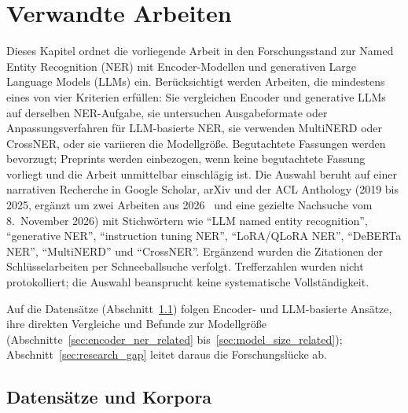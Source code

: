 %

\chapter{Verwandte Arbeiten}
\label{chap:verwandte_arbeiten}

Dieses Kapitel ordnet die vorliegende Arbeit in den Forschungsstand zur
Named Entity Recognition (NER) mit Encoder-Modellen und generativen Large
Language Models (LLMs) ein.
Berücksichtigt werden Arbeiten, die mindestens eines von vier Kriterien
erfüllen: Sie vergleichen Encoder und generative LLMs auf derselben
NER-Aufgabe, sie untersuchen Ausgabeformate oder Anpassungsverfahren für
LLM-basierte NER, sie verwenden MultiNERD oder CrossNER, oder sie
variieren die Modellgröße.
Begutachtete Fassungen werden bevorzugt; Preprints werden einbezogen,
wenn keine begutachtete Fassung vorliegt und die Arbeit unmittelbar
einschlägig ist.
Die Auswahl beruht auf einer narrativen Recherche in Google Scholar,
arXiv und der ACL Anthology (2019 bis 2025, ergänzt um zwei Arbeiten
aus 2026~\cite{zhan2026generativeNER,semin2026spanLabeling} und eine
gezielte Nachsuche vom 8.~November 2026) mit Stichwörtern wie
\enquote{LLM named entity recognition}, \enquote{generative NER},
\enquote{instruction tuning NER}, \enquote{LoRA/QLoRA NER},
\enquote{DeBERTa NER}, \enquote{MultiNERD} und \enquote{CrossNER}.
Ergänzend wurden die Zitationen der Schlüsselarbeiten per
Schneeballsuche verfolgt.
Trefferzahlen wurden nicht protokolliert; die Auswahl beansprucht keine
systematische Vollständigkeit.

Auf die Datensätze (Abschnitt~\ref{sec:datasets_corpora}) folgen Encoder- und
LLM-basierte Ansätze, ihre direkten Vergleiche und Befunde zur
Modellgröße (Abschnitte~\ref{sec:encoder_ner_related}
bis~\ref{sec:model_size_related}); Abschnitt~\ref{sec:research_gap}
leitet daraus die Forschungslücke ab.

\section{Datensätze und Korpora}
\label{sec:datasets_corpora}

